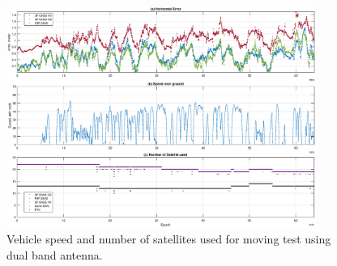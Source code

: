 \documentclass[letterpaper, 10 pt,onecolumn]{article}
\begin{document}
	\begin{figure}[H]
		\centering
		\includegraphics[width=0.9\textwidth]{figures/dynamicinfo_dual.eps}
		\caption{Vehicle speed and number of satellites used for moving test using dual band antenna.}
		\label{fig:m2vspeed}
	\end{figure}

    
    
\end{document}
